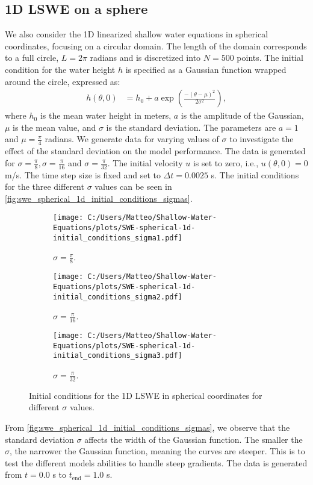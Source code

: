 \subsection*{1D LSWE on a sphere}
We also consider the 1D linearized shallow water equations in spherical coordinates, focusing on a circular domain.
The length of the domain corresponds to a full circle, $L = 2 \pi$ radians and is discretized into $N = 500$ points.
The initial condition for the water height $h$ is specified as a Gaussian function wrapped around the circle, expressed as:
\begin{align}\label{eq:1D_swe_spherical_ic}
    h(\theta, 0) &= h_0 + a \exp \left( \frac{-{(\theta-\mu)}^2}{2 \sigma^2} \right),
\end{align}
where $h_0$ is the mean water height in meters, $a$ is the amplitude of the Gaussian, $\mu$ is the mean value, and $\sigma$ is the standard deviation.
The parameters are $a = 1$  and $\mu = \frac{\pi}{4}$ radians.
We generate data for varying values of $\sigma$ to investigate the effect of the standard deviation on the model performance.
The data is generated for $\sigma = \frac{\pi}{8}, \sigma = \frac{\pi}{16}$ and $\sigma = \frac{\pi}{32}$.
The initial velocity $u$ is set to zero, i.e., $u(\theta,0) = 0$ m/s.
The time step size is fixed and set to $\Delta t = 0.0025$ s.
The initial conditions for the three different $\sigma$ values can be seen in \autoref{fig:swe_spherical_1d_initial_conditions_sigmas}.
\begin{figure}[H]
    \centering
    \begin{subfigure}[b]{0.32\textwidth}
        \centering
        \texttt{[image: C:/Users/Matteo/Shallow-Water-Equations/plots/SWE-spherical-1d-initial\_conditions\_sigma1.pdf]}
        \caption{$\sigma = \frac{\pi}{8}$.}\label{fig:swe_spherical_1d_sigma1}
    \end{subfigure}
    \begin{subfigure}[b]{0.32\textwidth}
        \centering
        \texttt{[image: C:/Users/Matteo/Shallow-Water-Equations/plots/SWE-spherical-1d-initial\_conditions\_sigma2.pdf]}
        \caption{$\sigma = \frac{\pi}{16}$.}\label{fig:swe_spherical_1d_sigma2}
    \end{subfigure}
    \begin{subfigure}[b]{0.32\textwidth}
        \centering
        \texttt{[image: C:/Users/Matteo/Shallow-Water-Equations/plots/SWE-spherical-1d-initial\_conditions\_sigma3.pdf]}
        \caption{$\sigma = \frac{\pi}{32}$.}\label{fig:swe_spherical_1d_sigma3}
    \end{subfigure}
    \caption{Initial conditions for the 1D LSWE in spherical coordinates for different \(\sigma\) values.}\label{fig:swe_spherical_1d_initial_conditions_sigmas}
\end{figure}
From \autoref{fig:swe_spherical_1d_initial_conditions_sigmas}, we observe that the standard deviation \(\sigma\) affects the width of the Gaussian function.
The smaller the $\sigma$, the narrower the Gaussian function, meaning the curves are steeper.
This is to test the different models abilities to handle steep gradients.
The data is generated from $t = 0.0$ s to $t_{\text{end}} = 1.0$ s.


